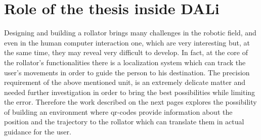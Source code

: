 \section{Role of the thesis inside DALi}
\vspace{0.5cm}
Designing and building a rollator brings many challenges in the robotic field, and even in the human computer interaction one, which are very interesting but, at the same time, they may reveal very difficult to develop. 
In fact, at the core of the rollator's functionalities there is a localization system which can track the user's movements in order to guide the person to his destination.
The precision requirement of the above mentioned unit, is an extremely delicate matter and needed further investigation in order to bring the best possibilities while limiting the error.
Therefore the work described on the next pages explores the possibility of building an environment where qr-codes provide information about the position and the trajectory to the rollator which can translate them in actual guidance for the user.






  

